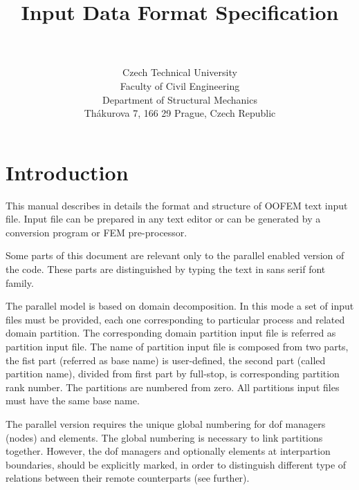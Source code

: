 \documentclass[a4paper]{report}
\newcommand{\Pmode}[1]{{\sffamily #1}}
\begin{document}
\title{
Input Data Format Specification}
\author{\bp \\ \\
Czech Technical University\\
Faculty of Civil Engineering\\
Department of Structural Mechanics\\
Th\'akurova 7, 166 29 Prague, Czech Republic
}
\maketitle

\newpage
\tableofcontents
\newpage
\chapter{Introduction}
This manual describes in details the format and structure of OOFEM
text input file. Input file can be prepared in any text editor or can be generated
by a conversion program or FEM pre-processor.

\Pmode{Some parts of this document are relevant only to the parallel enabled version of the code.
These parts are distinguished by typing the text in sans serif font family.}
\Pmode{The parallel model is based on domain decomposition. In this mode a set of input files must be provided, each one corresponding to 
particular process and related domain partition. The corresponding domain partition input file is referred as partition input file. 
The name of partition input file is composed from two parts, the fist part (referred as base
name) is user-defined, the second part (called partition name), divided from first part by
full-stop, is corresponding partition rank number. The partitions are numbered
from zero. All partitions input files must have the
same base name.

The parallel version requires the unique global numbering  for
dof managers (nodes) and elements. The global
numbering is necessary to link partitions together. However, the dof
managers and optionally elements at interpartion boundaries,
should be explicitly  marked, in order to distinguish different type
of relations between their remote counterparts (see further).
}
\end{document}
